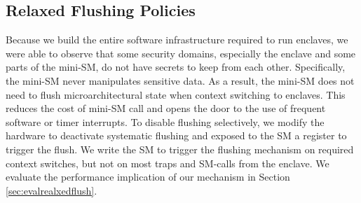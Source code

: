 \subsection{Relaxed Flushing Policies}
Because we build the entire software infrastructure required to run enclaves, we were able to observe that some security domains, especially the enclave and some parts of the mini-SM, do not have secrets to keep from each other.
Specifically, the mini-SM never manipulates sensitive data.
As a result, the mini-SM does not need to flush microarchitectural state when context switching to enclaves.
This reduces the cost of mini-SM call and opens the door to the use of frequent software or timer interrupts.
To disable flushing selectively, we modify the hardware to deactivate systematic flushing and exposed to the SM a register to trigger the flush.
We write the SM to trigger the flushing mechanism on required context switches, but not on most traps and SM-calls from the enclave.
We evaluate the performance implication of our mechanism in Section \ref{sec:evalrealxedflush}.

